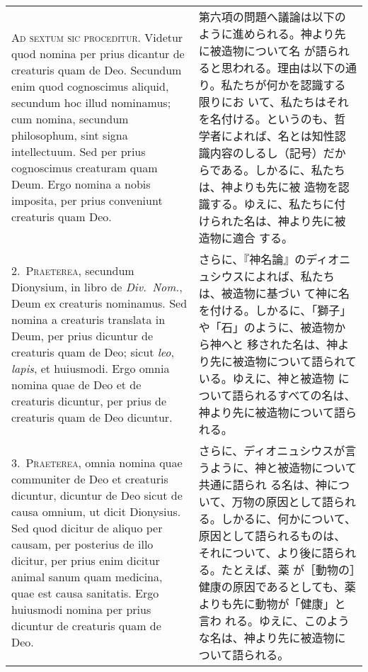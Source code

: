 \documentclass[paper=a4paper,fontsize=10pt,jafontsize=9pt,titlepage]{jlreq}
\begin{document}
\begin{longtable}{p{21em}p{21em}}
{\huge A}{\scshape d sextum sic proceditur}. Videtur quod nomina per
prius dicantur de creaturis quam de Deo. Secundum enim quod
cognoscimus aliquid, secundum hoc illud nominamus; cum nomina,
secundum philosophum, sint signa intellectuum. Sed per prius
cognoscimus creaturam quam Deum. Ergo nomina a nobis imposita, per
prius conveniunt creaturis quam Deo.

&

第六項の問題へ議論は以下のように進められる。神より先に被造物について名
が語られると思われる。理由は以下の通り。私たちが何かを認識する限りにお
いて、私たちはそれを名付ける。というのも、哲学者によれば、名とは知性認
識内容のしるし（記号）だからである。しかるに、私たちは、神よりも先に被
造物を認識する。ゆえに、私たちに付けられた名は、神より先に被造物に適合
する。

\\

2.~{\scshape Praeterea}, secundum Dionysium, in libro de {\itshape
Div.~Nom.}, Deum ex creaturis nominamus. Sed nomina a creaturis
translata in Deum, per prius dicuntur de creaturis quam de Deo; sicut
{\itshape leo}, {\itshape lapis}, et huiusmodi. Ergo omnia nomina quae
de Deo et de creaturis dicuntur, per prius de creaturis quam de Deo
dicuntur.

&

さらに、『神名論』のディオニュシウスによれば、私たちは、被造物に基づい
て神に名を付ける。しかるに、「獅子」や「石」のように、被造物から神へと
移された名は、神より先に被造物について語られている。ゆえに、神と被造物
について語られるすべての名は、神より先に被造物について語られる。

\\

3.~{\scshape Praeterea}, omnia nomina quae communiter de Deo et
creaturis dicuntur, dicuntur de Deo sicut de causa omnium, ut dicit
Dionysius. Sed quod dicitur de aliquo per causam, per posterius de
illo dicitur, per prius enim dicitur animal sanum quam medicina, quae
est causa sanitatis. Ergo huiusmodi nomina per prius dicuntur de
creaturis quam de Deo.

&

さらに、ディオニュシウスが言うように、神と被造物について共通に語られ
る名は、神について、万物の原因として語られる。しかるに、何かについて、
原因として語られるものは、それについて、より後に語られる。たとえば、薬
が［動物の］健康の原因であるとしても、薬よりも先に動物が「健康」と言わ
れる。ゆえに、このような名は、神より先に被造物について語られる。


\end{longtable}
\end{document}
